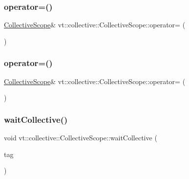 \subsubsection{\texorpdfstring{operator=()}{operator=()}\hspace{0.1cm}{\footnotesize\ttfamily [1/2]}}
{\footnotesize\ttfamily \hyperlink{structvt_1_1collective_1_1_collective_scope}{Collective\+Scope}\& vt\+::collective\+::\+Collective\+Scope\+::operator= (\begin{DoxyParamCaption}\item[{\hyperlink{structvt_1_1collective_1_1_collective_scope}{Collective\+Scope} \&\&}]{ }\end{DoxyParamCaption})\hspace{0.3cm}{\ttfamily [delete]}}

\mbox{\label{structvt_1_1collective_1_1_collective_scope_ae211d02b75ae45834e25eb1cd8c2f7d0}} 
\subsubsection{\texorpdfstring{operator=()}{operator=()}\hspace{0.1cm}{\footnotesize\ttfamily [2/2]}}
{\footnotesize\ttfamily \hyperlink{structvt_1_1collective_1_1_collective_scope}{Collective\+Scope}\& vt\+::collective\+::\+Collective\+Scope\+::operator= (\begin{DoxyParamCaption}\item[{\hyperlink{structvt_1_1collective_1_1_collective_scope}{Collective\+Scope} const \&}]{ }\end{DoxyParamCaption})\hspace{0.3cm}{\ttfamily [delete]}}

\mbox{\label{structvt_1_1collective_1_1_collective_scope_afae2807ff3adc0f1d6772411168064f9}} 
\subsubsection{\texorpdfstring{wait\+Collective()}{waitCollective()}}
{\footnotesize\ttfamily void vt\+::collective\+::\+Collective\+Scope\+::wait\+Collective (\begin{DoxyParamCaption}\item[{\hyperlink{namespacevt_a84ab281dae04a52a4b243d6bf62d0e52}{Tag\+Type}}]{tag }\end{DoxyParamCaption})}



